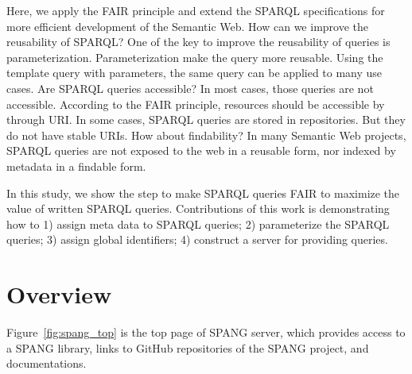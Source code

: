 \documentclass[runningheads]{llncs}
\begin{document}

Here, we apply the FAIR principle and extend the SPARQL specifications for more efficient development of the Semantic Web.
How can we improve the reusability of SPARQL?
One of the key to improve the reusability of queries is parameterization.
Parameterization make the query more reusable.
Using the template query with parameters, the same query can be applied to many use cases.
Are SPARQL queries accessible? In most cases, those queries are not accessible. According to the FAIR principle, resources should be accessible by through URI. In some cases, SPARQL queries are stored in repositories. But they do not have stable URIs. How about findability? 
In many Semantic Web projects, 
SPARQL queries are not exposed to the web in a reusable form, nor indexed by metadata in a findable form.

In this study, we show the step to make SPARQL queries FAIR to maximize the value of written SPARQL queries.
Contributions of this work is demonstrating how to
1) assign meta data to SPARQL queries;
2) parameterize the SPARQL queries;
3) assign global identifiers;
4) construct a server for providing queries.




\section{Overview}

Figure~\ref{fig:spang_top} is the top page of SPANG server, which provides access to a SPANG library, links to GitHub repositories of the SPANG project, and documentations.
\end{document}
